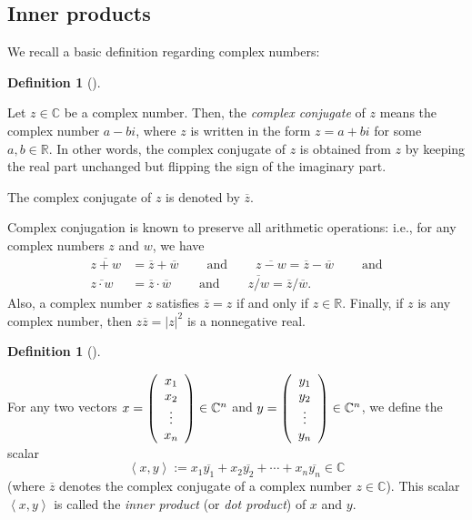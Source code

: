 \documentclass[numbers=enddot,12pt,final,onecolumn,notitlepage]{scrartcl}%
\numberwithin{exer}{subsection}
\theoremstyle{definition}
\newtheorem{defi}[theo]{Definition}
\newenvironment{definition}[1][]
{\begin{defi}[#1]\begin{leftbar}}
{\end{leftbar}\end{defi}}
\begin{document}
\subsection{Inner products}

We recall a basic definition regarding complex numbers:

\begin{definition}
Let $z\in\mathbb{C}$ be a complex number. Then, the \emph{complex conjugate}
of $z$ means the complex number $a-bi$, where $z$ is written in the form
$z=a+bi$ for some $a,b\in\mathbb{R}$. In other words, the complex conjugate of
$z$ is obtained from $z$ by keeping the real part unchanged but flipping the
sign of the imaginary part.

The complex conjugate of $z$ is denoted by $\overline{z}$.
\end{definition}

Complex conjugation is known to preserve all arithmetic operations: i.e., for
any complex numbers $z$ and $w$, we have%
\begin{align*}
\overline{z+w}  &  =\overline{z}+\overline{w}\ \ \ \ \ \ \ \ \ \ \text{and}%
\ \ \ \ \ \ \ \ \ \ \overline{z-w}=\overline{z}-\overline{w}%
\ \ \ \ \ \ \ \ \ \ \text{and}\\
\overline{z\cdot w}  &  =\overline{z}\cdot\overline{w}%
\ \ \ \ \ \ \ \ \ \ \text{and}\ \ \ \ \ \ \ \ \ \ \overline{z/w}=\overline
{z}/\overline{w}.
\end{align*}
Also, a complex number $z$ satisfies $\overline{z}=z$ if and only if
$z\in\mathbb{R}$. Finally, if $z$ is any complex number, then $z\overline
{z}=\left\vert z\right\vert ^{2}$ is a nonnegative real.

\begin{definition}
\label{def.unitary.innerprod.innerprod}For any two vectors $x=\left(
\begin{array}
[c]{c}%
x_{1}\\
x_{2}\\
\vdots\\
x_{n}%
\end{array}
\right)  \in\mathbb{C}^{n}$ and $y=\left(
\begin{array}
[c]{c}%
y_{1}\\
y_{2}\\
\vdots\\
y_{n}%
\end{array}
\right)  \in\mathbb{C}^{n}$, we define the scalar%
\begin{equation}
\left\langle x,y\right\rangle :=x_{1}\overline{y_{1}}+x_{2}\overline{y_{2}%
}+\cdots+x_{n}\overline{y_{n}}\in\mathbb{C}
\label{eq.def.unitary.innerprod.innerprod.def}%
\end{equation}
(where $\overline{z}$ denotes the complex conjugate of a complex number
$z\in\mathbb{C}$). This scalar $\left\langle x,y\right\rangle $ is called the
\emph{inner product} (or \emph{dot product}) of $x$ and $y$.
\end{definition}
\end{document}
